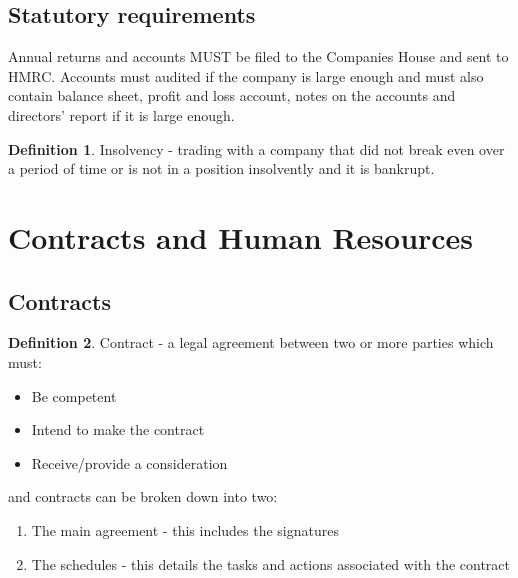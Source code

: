 \documentclass[a4paper]{article}
\theoremstyle{plain}
\theoremstyle{definition}
\newtheorem{defn}{Definition}[section]
\theoremstyle{remark}
\begin{document}
\subsection{Statutory requirements}
Annual returns and accounts MUST be filed to the Companies House and sent to HMRC. Accounts must audited if the company is large enough and must also contain balance sheet, profit and loss account, notes on the accounts and directors' report if it is large enough.
\begin{defn}
	Insolvency - trading with a company that did not break even over a period of time or is not in a position insolvently and it is bankrupt. 
\end{defn}
\section{Contracts and Human Resources}
\subsection{Contracts}
\begin{defn}
	Contract -  a legal agreement between two or more parties which must:
	\begin{itemize}
		\item Be competent
		\item Intend to make the contract
		\item Receive/provide a consideration
	\end{itemize}
\end{defn}
and contracts can be broken down into two:
\begin{enumerate}
	\item The main agreement - this includes the signatures
	\item The schedules - this details the tasks and actions associated with the contract
\end{enumerate}
\end{document}
